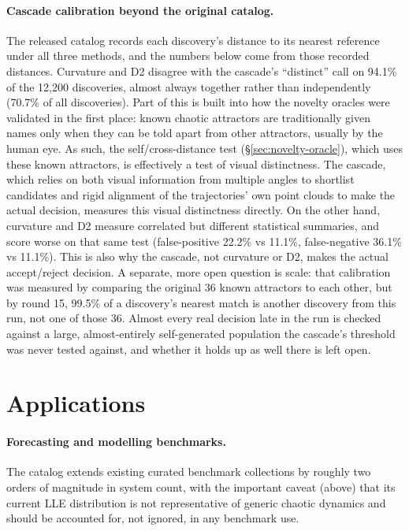 \documentclass[11pt]{article}
\begin{document}
\paragraph{Cascade calibration beyond the original catalog.}
\label{sec:cascade-calibration-limitation}
The released catalog records each discovery's distance to its nearest
reference under all three methods, and the numbers below come from those
recorded distances. Curvature and D2 disagree with the cascade's
``distinct'' call on 94.1\% of the 12{,}200 discoveries, almost always
together rather than independently (70.7\% of all discoveries). Part of
this is built into how the novelty oracles were validated in the first place:
known chaotic attractors are traditionally given names only when they can be 
told apart from other attractors, usually by the human eye.
As such, the self/cross-distance test (\S\ref{sec:novelty-oracle}), which
uses these known attractors, is effectively a test of visual distinctness.
The cascade, which relies on both visual information from multiple angles
to shortlist candidates and rigid alignment of the trajectories' own point
clouds to make the actual decision, measures this visual distinctness
directly. On the other hand, curvature and D2 measure correlated but
different statistical summaries, and score worse on that same test
(false-positive 22.2\% vs 11.1\%, false-negative 36.1\% vs 11.1\%). This is
also why the cascade, not curvature or D2, makes the actual accept/reject
decision. A separate,
more open question is scale: that calibration was measured by comparing the
original 36 known attractors to each other, but by round 15, 99.5\% of a
discovery's nearest match is another discovery from this run, not one of
those 36. Almost every real decision late in the run is checked against a
large, almost-entirely self-generated population the cascade's threshold was never tested
against, and whether it holds up as well there is left open.

\section{Applications}

\paragraph{Forecasting and modelling benchmarks.} The catalog extends
existing curated benchmark collections \citep{gilpin2021chaos,gilpin2023model}
by roughly two orders of magnitude in system count, with the important
caveat (above) that its current LLE distribution is not representative of
generic chaotic dynamics and should be accounted for, not ignored, in any
benchmark use.
\end{document}
